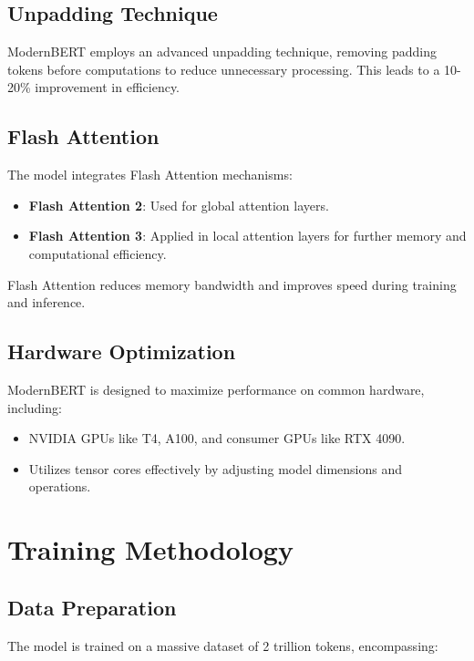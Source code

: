 \documentclass{article}
\begin{document}
\subsection{Unpadding Technique}  
  
ModernBERT employs an advanced unpadding technique, removing padding tokens before computations to reduce unnecessary processing. This leads to a 10-20\% improvement in efficiency.  
  
\subsection{Flash Attention}  
  
The model integrates Flash Attention mechanisms:  
  
\begin{itemize}  
    \item \textbf{Flash Attention 2}: Used for global attention layers.  
    \item \textbf{Flash Attention 3}: Applied in local attention layers for further memory and computational efficiency.  
\end{itemize}  
  
Flash Attention reduces memory bandwidth and improves speed during training and inference.  
  
\subsection{Hardware Optimization}  
  
ModernBERT is designed to maximize performance on common hardware, including:  
  
\begin{itemize}  
    \item NVIDIA GPUs like T4, A100, and consumer GPUs like RTX 4090.  
    \item Utilizes tensor cores effectively by adjusting model dimensions and operations.  
\end{itemize}  
  
\section{Training Methodology}  
  
\subsection{Data Preparation}  
  
The model is trained on a massive dataset of 2 trillion tokens, encompassing:  
  
\end{document}
